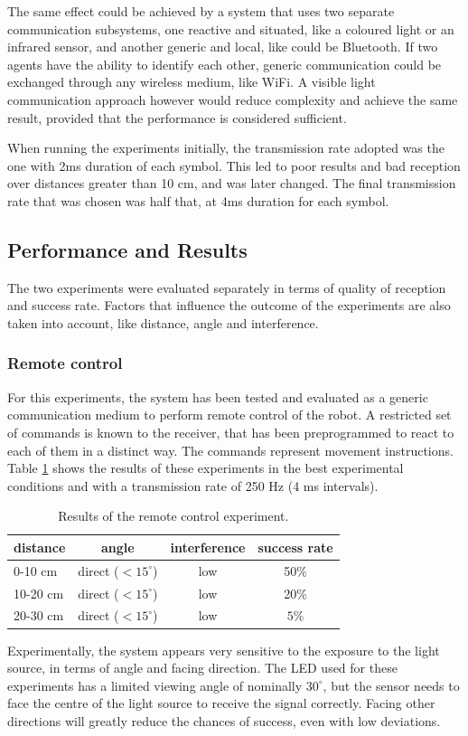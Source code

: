 The same effect could be achieved by a system that uses two separate communication subsystems, one reactive and situated, like a coloured light or an infrared sensor, and another generic and local, like could be Bluetooth.
If two agents have the ability to identify each other, generic communication could be exchanged through any wireless medium, like WiFi.
A visible light communication approach however would reduce complexity and achieve the same result, provided that the performance is considered sufficient.

When running the experiments initially, the transmission rate adopted was the one with 2ms duration of each symbol.
This led to poor results and bad reception over distances greater than 10 cm, and was later changed.
The final transmission rate that was chosen was half that, at 4ms duration for each symbol.

\subsection{Performance and Results}

The two experiments were evaluated separately in terms of quality of reception and success rate.
Factors that influence the outcome of the experiments are also taken into account, like distance, angle and interference.

\subsubsection{Remote control}
For this experiments, the system has been tested and evaluated as a generic communication  medium to perform remote control of the robot.
A restricted set of commands is known to the receiver, that has been preprogrammed to react to each of them in a distinct way.
The commands represent movement instructions.
Table \ref{tab:remotectrl} shows the results of these experiments in the best experimental conditions and with a transmission rate of 250 Hz (4 ms intervals).
\begin{table}[hbt]
\centering
  \begin{tabular}{l c c c}
    distance & angle & interference & success rate \\
    \hline
   0-10 cm & direct ($< 15^{\circ}$) & low & 50\%\\
   10-20 cm & direct ($< 15^{\circ}$) & low & 20\%\\
   20-30 cm & direct ($< 15^{\circ}$) & low & $5\%$\\
  \end{tabular}
  \caption{Results of the remote control experiment.}
  \label{tab:remotectrl}
\end{table}
Experimentally, the system appears very sensitive to the exposure to the light source, in terms of angle and facing direction.
The LED used for these experiments has a limited viewing angle of nominally $30^{\circ}$, but the sensor needs to face the centre of the light source to receive the signal correctly.
Facing other directions will greatly reduce the chances of success, even with low deviations.

